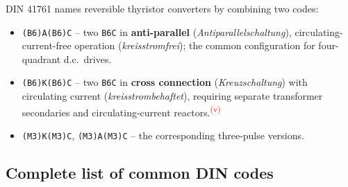 \documentclass[11pt,a4paper]{article}
\newcommand{\code}[1]{\texttt{#1}}
\newcommand{\verify}{\textsuperscript{\textcolor{red}{(v)}}}
\begin{document}
DIN 41761 names reversible thyristor converters by combining two codes:
\begin{itemize}
\item \code{(B6)A(B6)C} -- two \code{B6C} in \textbf{anti-parallel} (\emph{Antiparallelschaltung}), circulating-current-free operation (\emph{kreisstromfrei}); the common configuration for four-quadrant d.c.\ drives.
\item \code{(B6)K(B6)C} -- two \code{B6C} in \textbf{cross connection} (\emph{Kreuzschaltung}) with circulating current (\emph{kreisstrombehaftet}), requiring separate transformer secondaries and circulating-current reactors.\verify
\item \code{(M3)K(M3)C}, \code{(M3)A(M3)C} -- the corresponding three-pulse versions.
\end{itemize}

\subsection{Complete list of common DIN codes}
\end{document}
